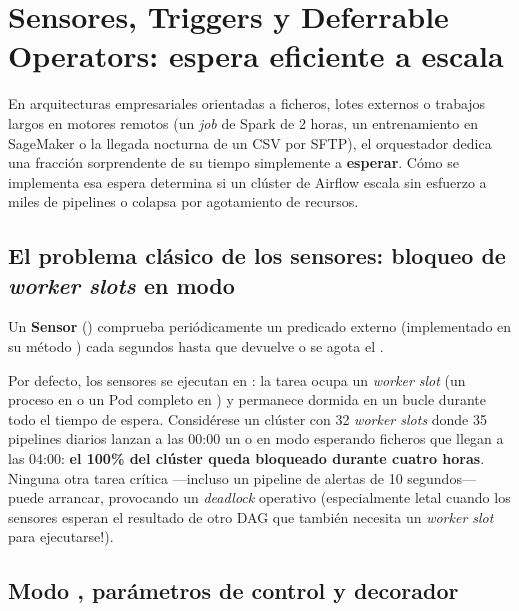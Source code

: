 \section{Sensores, Triggers y Deferrable Operators: espera eficiente a escala}\label{sec:sensores-triggers-deferrable}

En arquitecturas empresariales orientadas a ficheros, lotes externos o trabajos largos en motores remotos (un \textit{job} de Spark de 2 horas, un entrenamiento en SageMaker o la llegada nocturna de un CSV por SFTP), el orquestador dedica una fracción sorprendente de su tiempo simplemente a \textbf{esperar}. Cómo se implementa esa espera determina si un clúster de Airflow escala sin esfuerzo a miles de pipelines o colapsa por agotamiento de recursos.

\subsection{El problema clásico de los sensores: bloqueo de \textit{worker slots} en modo \texorpdfstring{}{poke}}

Un \textbf{Sensor} () comprueba periódicamente un predicado externo (implementado en su método ) cada  segundos hasta que devuelve  o se agota el .

Por defecto, los sensores se ejecutan en \textbf{}: la tarea ocupa un \textit{worker slot} (un proceso en  o un Pod completo en ) y permanece dormida en un bucle  durante todo el tiempo de espera. Considérese un clúster con 32 \textit{worker slots} donde 35 pipelines diarios lanzan a las 00:00 un  o  en modo  esperando ficheros que llegan a las 04:00: \textbf{el 100\% del clúster queda bloqueado durante cuatro horas}. Ninguna otra tarea crítica ---incluso un pipeline de alertas de 10 segundos--- puede arrancar, provocando un \textit{deadlock} operativo (especialmente letal cuando los sensores esperan el resultado de otro DAG que también necesita un \textit{worker slot} para ejecutarse!).

\subsection{Modo , parámetros de control y decorador \texorpdfstring{}{@task.sensor}}

